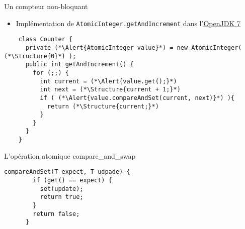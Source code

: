 
\begingroup

\begin{frame}[fragile]{Un compteur non-bloquant}
  \begin{itemize}
  \item Implémentation de \lstinline{AtomicInteger.getAndIncrement}
    dans l'\href{https://github.com/openjdk-mirror/jdk7u-jdk/blob/master/src/share/classes/java/util/concurrent/atomic/AtomicInteger.java}{OpenJDK 7}
  \end{itemize}

  \begin{lstlisting}
    class Counter {
      private (*\Alert{AtomicInteger value}*) = new AtomicInteger( (*\Structure{0}*) ); 
      public int getAndIncrement() {
        for (;;) {
          int current = (*\Alert{value.get();}*)
          int next = (*\Structure{current + 1;}*)
          if ( (*\Alert{value.compareAndSet(current, next)}*) ){
            return (*\Structure{current;}*)
          }
        }
      }
    }
  \end{lstlisting}
  
  \begin{block}{L'opération \alert{atomique} compare\_and\_swap}
    \begin{lstlisting}[gobble=4]
      compareAndSet(T expect, T udpade) {
        if (get() == expect) {
          set(update);
          return true;
        }
        return false;
      }
    \end{lstlisting}
  \end{block}


  
\end{frame}

\endgroup
\endinput
